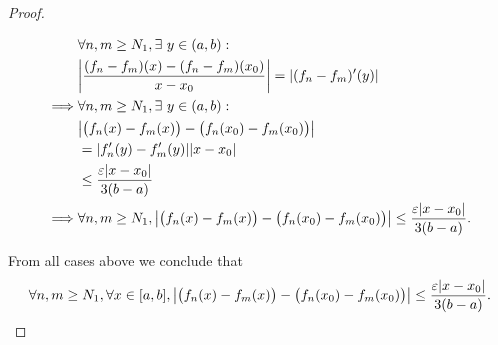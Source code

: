 \begin{proof}
\begin{itemize}
\begin{align*}
                     & \forall n, m \geq N_1, \exists\ y \in (a, b) :                                                                                           \\
                     & \abs{\dfrac{(f_n - f_m)(x) - (f_n - f_m)(x_0)}{x - x_0}} = \abs{(f_n - f_m)'(y)}                                                         \\
            \implies & \forall n, m \geq N_1, \exists\ y \in (a, b) :                                                                                           \\
                     & \abs{\big(f_n(x) - f_m(x)\big) - \big(f_n(x_0) - f_m(x_0)\big)}                                                                          \\
                     & = \abs{f_n'(y) - f_m'(y)} \abs{x - x_0}                                                                                                  \\
                     & \leq \dfrac{\varepsilon \abs{x - x_0}}{3(b - a)}                                                                                         \\
            \implies & \forall n, m \geq N_1, \abs{\big(f_n(x) - f_m(x)\big) - \big(f_n(x_0) - f_m(x_0)\big)} \leq \dfrac{\varepsilon \abs{x - x_0}}{3(b - a)}.
          \end{align*}
  \end{itemize}
  From all cases above we conclude that
  \[
    \forall n, m \geq N_1, \forall x \in [a, b], \abs{\big(f_n(x) - f_m(x)\big) - \big(f_n(x_0) - f_m(x_0)\big)} \leq \dfrac{\varepsilon \abs{x - x_0}}{3(b - a)}.
  \]


\end{proof}
